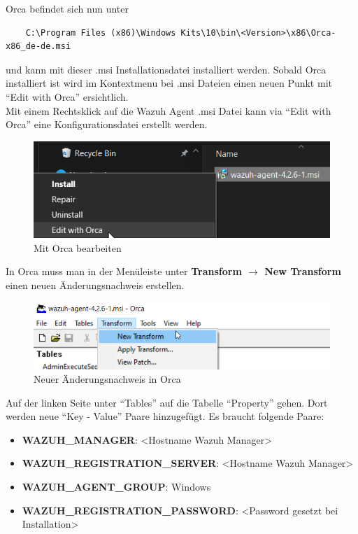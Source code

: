 Orca befindet sich nun unter
\begin{lstlisting}
    C:\Program Files (x86)\Windows Kits\10\bin\<Version>\x86\Orca-x86_de-de.msi
\end{lstlisting}
und kann mit dieser .msi Installationsdatei installiert werden.
Sobald Orca installiert ist wird im Kontextmenu bei .msi Dateien einen neuen Punkt mit ``Edit with Orca'' ersichtlich.\\

Mit einem Rechtsklick auf die Wazuh Agent .msi Datei kann via ``Edit with Orca'' eine Konfigurationsdatei erstellt werden.
\begin{figure}[H]
    \centering
    \includegraphics[width=\linewidth]{../img/agent/edit-with-orca.png}
    \caption{Mit Orca bearbeiten}
\end{figure}

In Orca muss man in der Menüleiste unter \textbf{Transform $\rightarrow$ New Transform} einen neuen Änderungsnachweis erstellen.
\begin{figure}[H]
    \centering
    \includegraphics[width=\linewidth]{../img/agent/new-transform.png}
    \caption{Neuer Änderungsnachweis in Orca}
\end{figure}

Auf der linken Seite unter ``Tables'' auf die Tabelle ``Property'' gehen.
Dort werden neue ``Key - Value'' Paare hinzugefügt.
Es braucht folgende Paare:
\begin{itemize}
    \item \textbf{WAZUH\_MANAGER}: <Hostname Wazuh Manager>
    \item \textbf{WAZUH\_REGISTRATION\_SERVER}: <Hostname Wazuh Manager>
    \item \textbf{WAZUH\_AGENT\_GROUP}: Windows
    \item \textbf{WAZUH\_REGISTRATION\_PASSWORD}: <Password gesetzt bei Installation>
\end{itemize}

